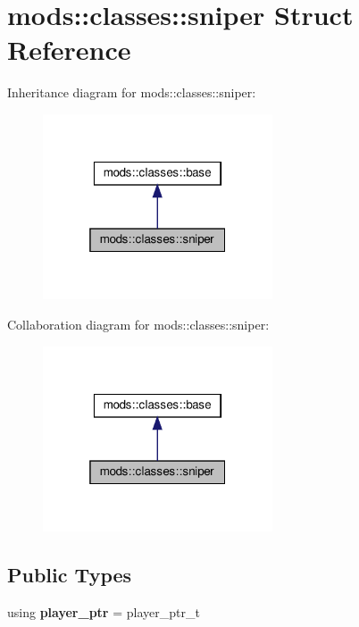 \hypertarget{structmods_1_1classes_1_1sniper}{}\section{mods\+:\+:classes\+:\+:sniper Struct Reference}
\label{structmods_1_1classes_1_1sniper}


Inheritance diagram for mods\+:\+:classes\+:\+:sniper\+:
\nopagebreak
\begin{figure}[H]
\begin{center}
\leavevmode
\includegraphics[width=193pt]{structmods_1_1classes_1_1sniper__inherit__graph}
\end{center}
\end{figure}


Collaboration diagram for mods\+:\+:classes\+:\+:sniper\+:
\nopagebreak
\begin{figure}[H]
\begin{center}
\leavevmode
\includegraphics[width=193pt]{structmods_1_1classes_1_1sniper__coll__graph}
\end{center}
\end{figure}
\subsection*{Public Types}
\begin{DoxyCompactItemize}
\item 
\mbox{\label{structmods_1_1classes_1_1sniper_ae150a35613d3e9c4b6aadd7d09beb885}} 
using {\bfseries player\+\_\+ptr} = player\+\_\+ptr\+\_\+t
\end{DoxyCompactItemize}
